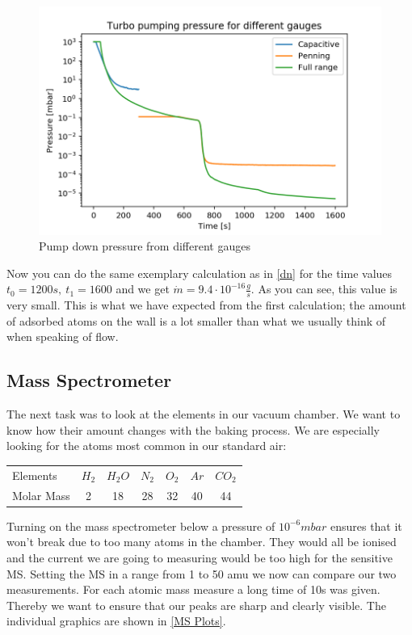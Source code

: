 \documentclass[]{article}
\begin{document}
\begin{figure}[!h]
	\centering
	\includegraphics[width=0.7\linewidth]{Plots/PumpingPressure}
	\caption{Pump down pressure from different gauges}
	\label{fig:pumpingpressure}
\end{figure}

Now you can do the same exemplary calculation as in \ref{dn} for the time values $t_0=1200s, \: t_1=1600$ and we get $ \dot{m} = 9.4\cdot10^{-16} \frac{g}{s}$. 
As you can see, this value is very small. This is what we have expected from the first calculation; the amount of adsorbed atoms on the wall is a lot smaller than what we usually think of when speaking of flow.


\subsection{Mass Spectrometer}
The next task was to look at the elements in our vacuum chamber. We want to know how their amount changes with the baking process. We are especially looking for the atoms most common in our standard air:

\begin{table}[h]
\centering
\begin{tabular}{lcccccc}
Elements & $H_2$ & $H_2O$ & $N_2$ & $O_2$ & $Ar$ & $CO_2$ \\
Molar Mass & 2 & 18 & 28 & 32 & 40 & 44 \\
\end{tabular} 
\end{table}

Turning on the mass spectrometer below a pressure of $10^{-6} mbar$ ensures that it won't break due to too many atoms in the chamber. They would all be ionised and the current we are going to measuring would be too high for the sensitive MS. Setting the MS in a range from 1 to 50 amu we now can compare our two measurements. For each atomic mass measure a long time of 10s was given. Thereby we want to ensure that our peaks are sharp and clearly visible. The individual graphics are shown in \ref{MS Plots}.
\end{document}
